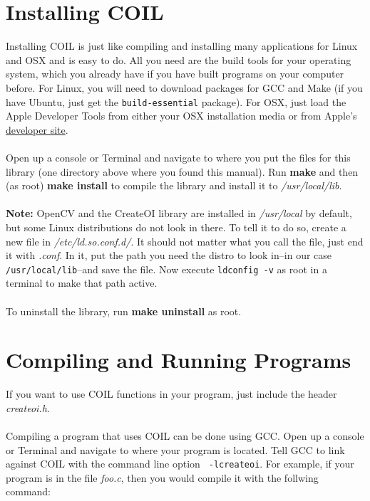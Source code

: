 \documentclass {article}
\begin{document}
\newpage


\section {Installing COIL}
Installing COIL is just like compiling and installing many
applications for Linux and OSX and is easy to do.  All you need are
the build tools for your operating system, which you already have if
you have built programs on your computer before.  For Linux, you will
need to download packages for GCC and Make (if you have Ubuntu, just
get the {\tt build-essential} package).  For OSX, just load the Apple
Developer Tools from either your OSX installation media or from
Apple's
\href{http://developer.apple.com/}{developer site}. \\
\\
Open up a console or Terminal and navigate to where you put the files
for this library (one directory above where you found this manual).
Run {\bf make} and then (as root) {\bf make install}
to compile the library and install it to {\it /usr/local/lib}. \\
\\
{\bf Note:} OpenCV and the CreateOI library are installed in {\it
  /usr/local} by default, but some Linux distributions do not look in
there.  To tell it to do so, create a new file in {\it
  /etc/ld.so.conf.d/}.  It should not matter what you call the file,
just end it with {\it .conf}.  In it, put the path you need the distro
to look in--in our case {\tt /usr/local/lib}--and save the
file.  Now execute {\tt ldconfig -v} as root in a terminal to make that path active. \\
\\
To uninstall the library, run {\bf make uninstall} as root.


\section {Compiling and Running Programs}
If you want to use COIL functions in your program, just include the
header {\it createoi.h}.
\\ \\
Compiling a program that uses COIL can be done using GCC.  Open up a
console or Terminal and navigate to where your program is located.
Tell GCC to link against COIL with the command line option {\tt
  -lcreateoi}.  For example, if your program is in the file {\it
  foo.c}, then you would compile it with the follwing command:
\end{document}
